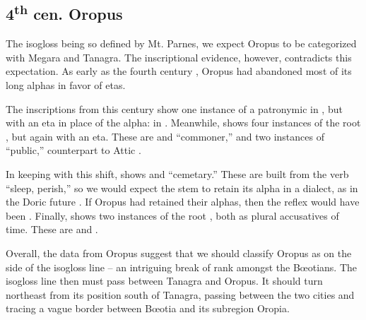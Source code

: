 \subsection{4\textsuperscript{th} cen.  Oropus}
The isogloss being so defined by Mt. Parnes, 
we expect Oropus to be categorized with Megara and Tanagra.
The inscriptional evidence, however,
contradicts this expectation.
As early as the fourth century , 
Oropus had abandoned most of its long alphas in favor of etas.

The inscriptions from this century show one instance of a patronymic in ,
but with an eta in place of the alpha:  in .
Meanwhile,
 shows four instances of the root , but again with an eta. 
These are  and  ``commoner,''
and two instances of  ``public,''
counterpart to Attic .

In keeping with this shift,
 shows  and  ``cemetary.''
These are built from the verb  ``sleep,  perish,''
so we would expect the stem to retain its alpha in a  dialect,
as in the Doric future .
If Oropus had retained their alphas, then the reflex would have been . 
Finally,
 shows two instances of the root ,
both as plural accusatives of time.
These are  and .

Overall, the data from Oropus suggest that we should classify Oropus as on the  side of the isogloss line --
an intriguing break of rank amongst the Bœotians. 
The isogloss line then must pass between Tanagra and Oropus.
It should turn northeast from its position south of Tanagra,
passing between the two cities and tracing a vague border between Bœotia and its subregion Oropia.